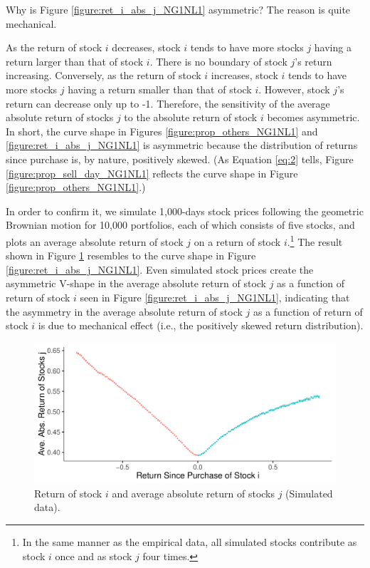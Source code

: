 \documentclass[11pt, a4paper]{article}
\begin{document}
Why is Figure \ref{figure:ret_i_abs_j_NG1NL1} asymmetric? The reason is quite mechanical.

As the return of stock $i$ decreases, stock $i$ tends to have more stocks $j$ having a return larger than that of stock $i$. There is no boundary of stock $j$'s return increasing. Conversely, as the return of stock $i$ increases, stock $i$ tends to have more stocks $j$ having a return smaller than that of stock $i$. However,  stock $j$'s return can decrease only up to -1. Therefore, the sensitivity of the average absolute return of stocks $j$ to the absolute return of stock $i$ becomes asymmetric. 
In short, the curve shape in Figures \ref{figure:prop_others_NG1NL1} and \ref{figure:ret_i_abs_j_NG1NL1} is asymmetric because the distribution of returns since purchase is, by nature, positively skewed. (As Equation \ref{eq:2} tells, Figure \ref{figure:prop_sell_day_NG1NL1} reflects the curve shape in Figure \ref{figure:prop_others_NG1NL1}.)

In order to confirm it, we simulate 1,000-days stock prices following the geometric Brownian motion for 10,000 portfolios, each of which consists of five stocks, and plots an average absolute return of stock $j$ on a return of stock $i$.\footnote{In the same manner as the empirical data, all simulated stocks contribute as stock $i$ once and as stock $j$ four times.} The result shown in Figure \ref{figure:ret_i_abs_j_sim} resembles to the curve shape in Figure \ref{figure:ret_i_abs_j_NG1NL1}. Even simulated stock prices create the asymmetric V-shape in the average absolute return of stock $j$ as a function of return of stock $i$ seen in Figure \ref{figure:ret_i_abs_j_NG1NL1}, indicating that the asymmetry in the average absolute return of stock $j$ as a function of return of stock $i$ is due to mechanical effect (i.e., the positively skewed return distribution).\\

\begin{figure}[H]
	\centering
	\includegraphics[width=0.8\columnwidth]{sim_R_i_abs_R_j.pdf}
	\caption{Return of stock $i$ and average absolute return of stocks $j$ (Simulated data).}
	\label{figure:ret_i_abs_j_sim}
\end{figure}
\end{document}
